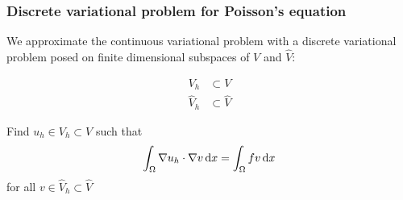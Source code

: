 \begin{frame}
  \frametitle{Discrete variational problem for Poisson's equation}

  We approximate the continuous variational problem with a discrete
  variational problem posed on finite dimensional subspaces of $V$ and $\hat{V}$:

  \begin{align*}
    V_h &\subset V \\
    \hat{V}_h &\subset \hat{V}
  \end{align*}

  \bigskip

  Find $u_h \in V_h \subset V$ such that
  \begin{equation*}
    \int_{\Omega} \nabla u_h \cdot \nabla v \, \mathrm{d}x =
    \int_{\Omega} fv \, \mathrm{d}x
  \end{equation*}
  for all $v \in \hat{V}_h \subset \hat{V}$

\end{frame}
